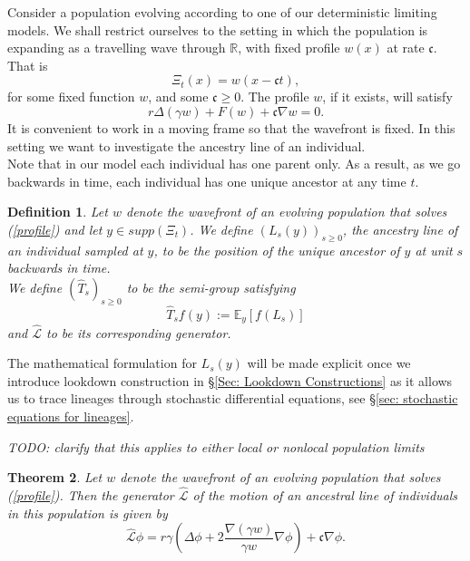 \documentclass[12pt]{article}
\newtheorem{theorem}{Theorem}[section]
\newtheorem{definition}[theorem]{Definition}
\def \hat{\widehat}
\newcommand{\IR}{\mathbb R}
\newcommand{\plr}[1]{\todo[inline]{Peter: #1}}
\newcommand{\comment}[1]{{\color{blue} \it #1}}
\begin{document}
Consider a population evolving according to one of our deterministic
limiting models. We shall restrict ourselves
to the setting in which the population is expanding as a travelling wave
through $\IR$, with fixed profile $w(x)$ at rate $\mathfrak{c}$. That is 
$$\Xi_t(x)=w(x-\mathfrak{c}t),$$
for some fixed function $w$, and some $\mathfrak{c}\geq0$.  The profile $w$, if it exists, will satisfy
\begin{equation}
\label{profile}
r\Delta(\gamma w)+F(w)+\mathfrak{c}\nabla w=0.
\end{equation} 
It is convenient to work in a moving frame so that the wavefront is fixed. In this setting we want to investigate the ancestry line of an individual.\\
Note that in our model each individual has one parent only. As a result, as we go backwards in time, each individual has one unique ancestor at any time $t$.
\begin{definition}\label{def: Ancestry Line}
Let $w$ denote the wavefront of an evolving population that solves (\ref{profile}) and let $y \in supp(\Xi_t)$. We define $(L_s(y))_{s \geq 0}$, the ancestry line of an individual sampled at $y$, to be the position of the unique ancestor of $y$ at unit $s$ backwards in time.\\
We define $(\hat{T}_s)_{s \geq 0}$ to be the semi-group satisfying
$$\hat{T}_sf(y):=\mathbb{E}_{y}[f(L_s)]$$ and 
$\hat{\mathcal{L}}$ to be its corresponding generator. 
\end{definition}
The mathematical formulation for $L_s(y)$ will be made explicit once we introduce lookdown construction in \S \ref{Sec: Lookdown Constructions} as it allows us to trace lineages through stochastic differential equations, see \S \ref{sec: stochastic equations for lineages}.

\plr{Main Theorem 3}

\comment{TODO: clarify that this applies to either local or nonlocal population limits}

\begin{theorem} \label{teo:ancestral lineages}
    Let $w$ denote the wavefront of an evolving population that solves (\ref{profile}).
    Then the generator $\hat{\mathcal{L}}$ of the motion of an ancestral line of individuals in this population is given by
    \begin{equation}
    \label{eq: generator of lineage motions}
        \hat{\mathcal{L}} \phi
        =
        r\gamma\left(\Delta\phi+2\frac{\nabla(\gamma w)}{\gamma w}\nabla\phi\right)
        +\mathfrak{c} \nabla\phi.
    \end{equation}
\end{theorem}
\end{document}
